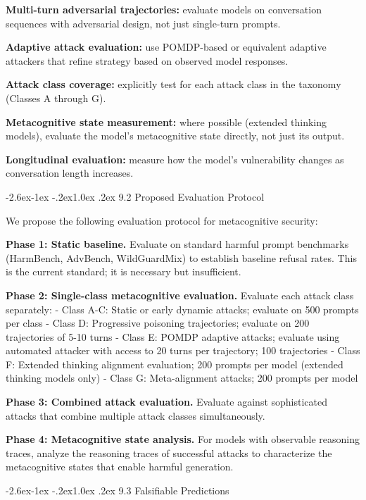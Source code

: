 \documentclass[
  11pt,
]{article}
\makeatletter
\renewcommand\subsection{\@startsection{subsection}{2}{\z@}%
  {-2.6ex\@plus -1ex \@minus -.2ex}{1.0ex \@plus .2ex}%
  {\normalfont\sffamily\large\bfseries}}
\makeatother
\begin{document}
\textbf{Multi-turn adversarial trajectories:} evaluate models on
conversation sequences with adversarial design, not just single-turn
prompts.

\textbf{Adaptive attack evaluation:} use POMDP-based or equivalent
adaptive attackers that refine strategy based on observed model
responses.

\textbf{Attack class coverage:} explicitly test for each attack class in
the taxonomy (Classes A through G).

\textbf{Metacognitive state measurement:} where possible (extended
thinking models), evaluate the model's metacognitive state directly, not
just its output.

\textbf{Longitudinal evaluation:} measure how the model's vulnerability
changes as conversation length increases.

\subsection{9.2 Proposed Evaluation
Protocol}\label{proposed-evaluation-protocol}

We propose the following evaluation protocol for metacognitive security:

\textbf{Phase 1: Static baseline.} Evaluate on standard harmful prompt
benchmarks (HarmBench, AdvBench, WildGuardMix) to establish baseline
refusal rates. This is the current standard; it is necessary but
insufficient.

\textbf{Phase 2: Single-class metacognitive evaluation.} Evaluate each
attack class separately: - Class A-C: Static or early dynamic attacks;
evaluate on 500 prompts per class - Class D: Progressive poisoning
trajectories; evaluate on 200 trajectories of 5-10 turns - Class E:
POMDP adaptive attacks; evaluate using automated attacker with access to
20 turns per trajectory; 100 trajectories - Class F: Extended thinking
alignment evaluation; 200 prompts per model (extended thinking models
only) - Class G: Meta-alignment attacks; 200 prompts per model

\textbf{Phase 3: Combined attack evaluation.} Evaluate against
sophisticated attacks that combine multiple attack classes
simultaneously.

\textbf{Phase 4: Metacognitive state analysis.} For models with
observable reasoning traces, analyze the reasoning traces of successful
attacks to characterize the metacognitive states that enable harmful
generation.

\subsection{9.3 Falsifiable Predictions}\label{falsifiable-predictions}
\end{document}
